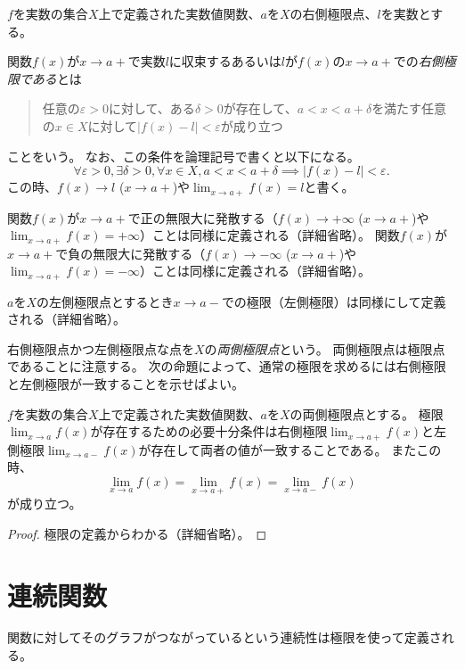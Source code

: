 \begin{definition}[片側極限]
$f$を実数の集合$X$上で定義された実数値関数、$a$を$X$の右側極限点、$l$を実数とする。

関数$f(x)$が$x \to a+$で実数$l$に収束するあるいは$l$が$f(x)$の$x \to a+$での\emph{右側極限である}とは
\begin{quote}
任意の$\varepsilon > 0$に対して、ある$\delta > 0$が存在して、$a < x < a+\delta$を満たす任意の$x \in X$に対して$|f(x)-l| < \varepsilon$が成り立つ
\end{quote}
ことをいう。
なお、この条件を論理記号で書くと以下になる。
$$
\forall \varepsilon > 0, \exists \delta > 0, \forall x \in X, a < x < a+\delta \implies |f(x)-l| < \varepsilon.
$$
この時、$f(x) \to l$ ($x \to a+$)や$\lim_{x \to a+}f(x) = l$と書く。

関数$f(x)$が$x \to a+$で正の無限大に発散する（$f(x) \to +\infty$ ($x \to a+$)や$\lim_{x \to a+}f(x) = +\infty$）ことは同様に定義される（詳細省略）。
関数$f(x)$が$x \to a+$で負の無限大に発散する（$f(x) \to -\infty$ ($x \to a+$)や$\lim_{x \to a+}f(x) = -\infty$）ことは同様に定義される（詳細省略）。

$a$を$X$の左側極限点とするとき$x \to a-$での極限（左側極限）は同様にして定義される（詳細省略）。
\end{definition}

右側極限点かつ左側極限点な点を$X$の\emph{両側極限点}という。
両側極限点は極限点であることに注意する。
次の命題によって、通常の極限を求めるには右側極限と左側極限が一致することを示せばよい。

\begin{proposition}
\label{t_lim_oslim}
$f$を実数の集合$X$上で定義された実数値関数、$a$を$X$の両側極限点とする。
極限$\lim_{x \to a}f(x)$が存在するための必要十分条件は右側極限$\lim_{x \to a+}f(x)$と左側極限$\lim_{x \to a-}f(x)$が存在して両者の値が一致することである。
またこの時、
$$
\lim_{x \to a}f(x) = \lim_{x \to a+}f(x) = \lim_{x \to a-}f(x)
$$
が成り立つ。
\end{proposition}

\begin{proof}
極限の定義からわかる（詳細省略）。
\end{proof}

\section{連続関数}

関数に対してそのグラフがつながっているという連続性は極限を使って定義される。

